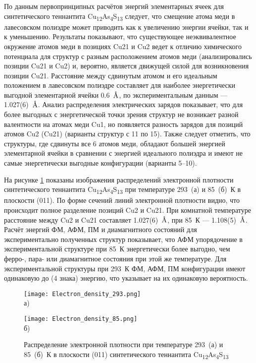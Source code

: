 По данным первопринципных расчётов энергий элементарных ячеек для синтетического теннантита Cu\textsubscript{12}As\textsubscript{4}S\textsubscript{13} следует,  что смещение атома меди в лавесовском полиэдре может приводить как к увеличению энергии ячейки, так и к уменьшению.
Результаты показывают, что существующее неэквивалентное  окружение атомов меди в позициях Cu21 и Cu2 ведет к отличию химического потенциала для структур с разным расположением атомов меди (анализировались позиции Cu21 и Cu2) и, вероятно, является движущей силой для возникновения позиции Cu21. Расстояние между сдвинутым атомом и его идеальным положением в лавесовском полиэдре составляет для наиболее энергетически выгодной элементарной ячейки 0.6~$\mbox{\normalfont\AA}$, по экспериментальным данным --- 1.027(6)~$\mbox{\normalfont\AA}$.
Анализ распределения электрических зарядов показывает, что для более выгодных с энергетической точки зрения структур не возникает разной валентности на атомах меди Cu1,
но появляется разность зарядов для позиций атомов Cu2 (Cu21) (варианты структур с 11 по 15). Также следует отметить, что структуры, где сдвинуты все 6 атомов меди, обладают большей энергией элементарной ячейки в сравнении с энергией идеального полиэдра и имеют не самые энергетически выгодные конфигурации  (варианты 5--10).

На рисунке \ref{img:xray2} показаны изображения распределений электронной плотности синтетического теннантита Cu\textsubscript{12}As\textsubscript{4}S\textsubscript{13} при температуре 293~(а) и 85~(б)~К в плоскости (011).
По форме сечений линий электронной плотности видно, что происходит полное разделение позиций Cu2 и Cu21.
При комнатной температуре расстояние между Cu2 и Cu21 составляет 1.027(6)~$\mbox{\normalfont\AA}$, при 85~К --- 1.108(5)~$\mbox{\normalfont\AA}$.
Расчёт энергий ФМ, АФМ, ПМ и диамагнитного состояний для экспериментально полученных структур показывает, что АФМ упорядочение в экспериментальной структуре при 85~К энергетически более выгодно, чем ферро-, пара- или диамагнитное состояния при этой же температуре.
Для экспериментальной структуры при 293~К ФМ, АФМ, ПМ конфигурации имеют одинаковую до (4 знака) энергию, что указывает на их одинаковую вероятность.

\begin{figure}[hb]
  \begin{minipage}[ht]{0.5\linewidth}\centering
    \texttt{[image: Electron\_density\_293.png]} \\ а)
  \end{minipage}
  \hfill
  \begin{minipage}[ht]{0.5\linewidth}\centering
    \texttt{[image: Electron\_density\_85.png]} \\ б)
  \end{minipage}

      \caption[Распределение электронной плотности при температуре 293~(а) и 85~(б)~К в плоскости (011) синтетического теннантита Cu\textsubscript{12}As\textsubscript{4}S\textsubscript{13}]{Распределение электронной плотности при температуре 293~(а) и 85~(б)~К в плоскости (011) синтетического теннантита Cu\textsubscript{12}As\textsubscript{4}S\textsubscript{13}}
    \label{img:xray2}
\end{figure}

